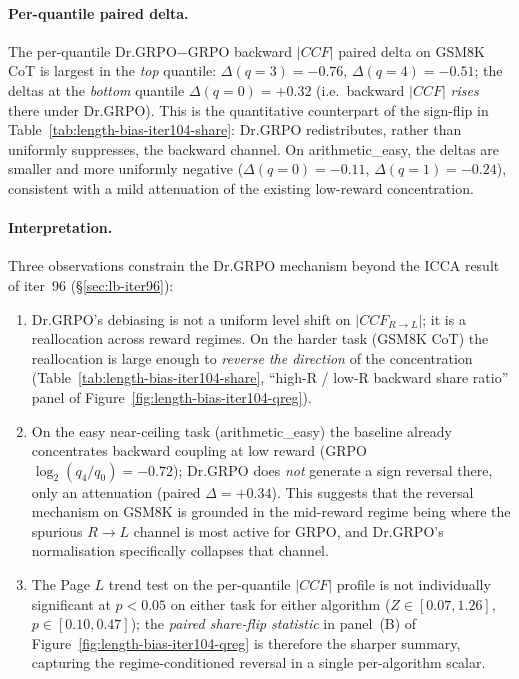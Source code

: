 \paragraph{Per-quantile paired delta.}
The per-quantile Dr.GRPO$-$GRPO backward $|CCF|$ paired delta on GSM8K CoT
is largest in the \emph{top} quantile:
$\Delta(q=3)=-0.76$, $\Delta(q=4)=-0.51$; the deltas at the
\emph{bottom} quantile $\Delta(q=0)=+0.32$ (i.e.\ backward $|CCF|$
\emph{rises} there under Dr.GRPO). This is the quantitative counterpart
of the sign-flip in Table~\ref{tab:length-bias-iter104-share}: Dr.GRPO
redistributes, rather than uniformly suppresses, the backward channel.
On arithmetic\_easy, the deltas are smaller and more uniformly negative
($\Delta(q=0)=-0.11$, $\Delta(q=1)=-0.24$), consistent with a
mild attenuation of the existing low-reward concentration.

\paragraph{Interpretation.}
Three observations constrain the Dr.GRPO mechanism beyond the ICCA
result of iter~96 (\S\ref{sec:lb-iter96}):

\begin{enumerate}
\item Dr.GRPO's debiasing is not a uniform level shift on $|CCF_{R\to L}|$;
it is a reallocation across reward regimes. On the harder task
(GSM8K CoT) the reallocation is large enough to \emph{reverse the
direction} of the concentration (Table~\ref{tab:length-bias-iter104-share},
``high-R / low-R backward share ratio'' panel of
Figure~\ref{fig:length-bias-iter104-qreg}).
\item On the easy near-ceiling task (arithmetic\_easy) the baseline
already concentrates backward coupling at low reward (GRPO
$\log_2(q_4/q_0)=-0.72$); Dr.GRPO does \emph{not} generate a sign
reversal there, only an attenuation (paired $\Delta = +0.34$). This
suggests that the reversal mechanism on GSM8K is grounded in the
mid-reward regime being where the spurious $R\to L$ channel is most
active for GRPO, and Dr.GRPO's normalisation specifically collapses
that channel.
\item The Page $L$ trend test on the per-quantile $|CCF|$ profile is
not individually significant at $p<0.05$ on either task for either
algorithm ($Z \in [0.07, 1.26]$, $p \in [0.10, 0.47]$); the
\emph{paired share-flip statistic} in panel~(B) of
Figure~\ref{fig:length-bias-iter104-qreg} is therefore the sharper
summary, capturing the regime-conditioned reversal in a single
per-algorithm scalar.
\end{enumerate}

